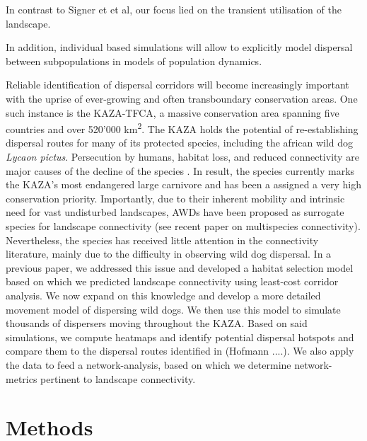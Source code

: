 \documentclass[abstract=on,10pt,a4paper,bibliography=totocnumbered]{article}
\begin{document}
In contrast to Signer et et al, our focus lied on the transient utilisation of
the landscape.

In addition, individual based simulations will allow to explicitly model
dispersal between subpopulations in models of population dynamics.

Reliable identification of dispersal corridors will become increasingly
important with the uprise of ever-growing and often transboundary conservation
areas. One such instance is the KAZA-TFCA, a massive conservation area spanning
five countries and over 520'000 km\textsuperscript{2}. The KAZA holds the
potential of re-establishing dispersal routes for many of its protected species,
including the african wild dog \textit{Lycaon pictus}.  Persecution by humans,
habitat loss, and reduced connectivity are major causes of the decline of the
species \citep{Woodroffe.2012}. In result, the species currently marks the
KAZA's most endangered large carnivore and has been a assigned a very high
conservation priority. Importantly, due to their inherent mobility and intrinsic
need for vast undisturbed landscapes, AWDs have been proposed as surrogate
species for landscape connectivity (see recent paper on multispecies
connectivity). Nevertheless, the species has received little attention in the
connectivity literature, mainly due to the difficulty in observing wild dog
dispersal. In a previous paper, we addressed this issue and developed a habitat
selection model based on which we predicted landscape connectivity using
least-cost corridor analysis. We now expand on this knowledge and develop a more
detailed movement model of dispersing wild dogs. We then use this model to
simulate thousands of dispersers moving throughout the KAZA. Based on said
simulations, we compute heatmaps and identify potential dispersal hotspots and
compare them to the dispersal routes identified in (Hofmann ....). We also apply
the data to feed a network-analysis, based on which we determine network-metrics
pertinent to landscape connectivity.

\section{Methods}
\end{document}
